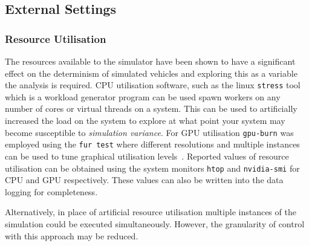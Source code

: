 \documentclass[letterpaper, 10 pt, journal, twoside]{IEEEtran}
\begin{document}


\subsection{External Settings}

\subsubsection{Resource Utilisation}
The resources available to the simulator have been shown to have a significant effect on the determinism of simulated vehicles and exploring this as a variable the analysis is required. 
CPU utilisation software, such as the linux \texttt{stress} tool which is a workload generator program can be used spawn workers on any number of cores or virtual threads on a system. This can be used to artificially increased the load on the system to explore at what point your system may become susceptible to \textit{simulation variance}. For GPU utilisation \texttt{gpu-burn} was employed using the \texttt{fur test} where different resolutions and multiple instances can be used to tune graphical utilisation levels~\cite{GPU_stress}. Reported values of resource utilisation can be obtained using the system monitors \texttt{htop} and \texttt{nvidia-smi} for CPU and GPU respectively. These values can also be written into the data logging for completeness.

Alternatively, in place of artificial resource utilisation multiple instances of the simulation could be executed simultaneously. However, the granularity of control with this approach may be reduced.


\end{document}
